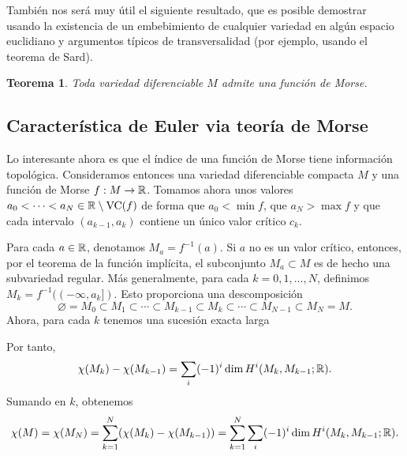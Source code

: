 \documentclass[11pt,a4paper]{amsbook}
\newtheorem{thm}[subsection]{Teorema}
\theoremstyle{remark} \newtheorem{rmk}[subsection]{Observación}
\theoremstyle{definition} \newtheorem{defn}[subsection]{Definición}
\theoremstyle{definition} \newtheorem{ex}[subsection]{Ejemplo}
\theoremstyle{definition} \newtheorem{ej}[subsection]{Ejercicio}
\begin{document}
También nos será muy útil el siguiente resultado, que es posible demostrar usando la existencia de un embebimiento de cualquier variedad en algún espacio euclidiano y argumentos típicos de transversalidad (por ejemplo, usando el teorema de Sard).

\begin{thm}
  Toda variedad diferenciable $M$ admite una función de Morse.
\end{thm}

\subsection{Característica de Euler via teoría de Morse} Lo interesante ahora es que el índice de una función de Morse tiene información topológica. Consideramos entonces una variedad diferenciable compacta $M$ y una función de Morse $f:M\rightarrow \mathbb R$. Tomamos ahora unos valores $a_0< \dots <a_N \in \mathbb R\setminus \operatorname{VC}(f)$ de forma que $a_0< \min f$, que $a_N> \max f$ y que cada intervalo $(a_{k-1},a_k)$ contiene un único valor crítico $c_k$.

Para cada $a\in \mathbb R$, denotamos $M_a=f^{-1}(a)$. Si $a$ no es un valor crítico, entonces, por el teorema de la función implícita, el subconjunto $M_a\subset M$ es de hecho una subvariedad regular. Más generalmente, para cada $k=0,1,\dots,N$, definimos $M_k=f^{-1}((-\infty,a_k])$. Esto proporciona una descomposición
\begin{equation*}
\varnothing =  M_0 \subset M_1 \subset \cdots \subset M_{k-1} \subset M_{k} \subset \cdots \subset M_{N-1} \subset M_N = M.
\end{equation*}
Ahora, para cada $k$ tenemos una sucesión exacta larga
\begin{center}
\end{center}
Por tanto,
\begin{equation*}
\chi(M_{k})- \chi(M_{k-1}) = \sum_{i} (-1)^i \dim H^i(M_{k},M_{k-1};\mathbb R).
\end{equation*}
Sumando en $k$, obtenemos
\begin{equation*}
\chi(M) = \chi(M_N) =\sum_{k=1}^N (\chi(M_{k})- \chi(M_{k-1})) = \sum_{k=1}^N \sum_{i} (-1)^i \dim H^i(M_{k},M_{k-1};\mathbb R).
\end{equation*}
\end{document}
